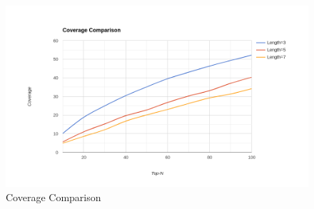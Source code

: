 \begin{figure}[h!]
   \centering
   \includegraphics[width=1\linewidth]{images/coverage-comparison.png}
   \caption{Coverage Comparison}
   \label{fig:coverage-comparison}
\end{figure}
